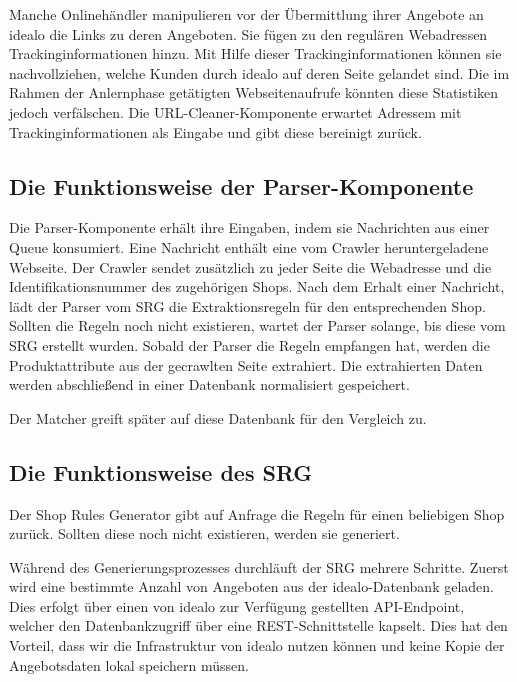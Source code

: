 Manche Onlinehändler manipulieren vor der Übermittlung ihrer Angebote an idealo die Links zu deren Angeboten.
Sie fügen zu den regulären Webadressen Trackinginformationen hinzu.
Mit Hilfe dieser Trackinginformationen können sie nachvollziehen, welche Kunden durch idealo auf deren Seite gelandet
sind.
Die im Rahmen der Anlernphase getätigten Webseitenaufrufe könnten diese Statistiken jedoch verfälschen.
Die URL-Cleaner-Komponente erwartet Adressem mit Trackinginformationen als Eingabe und gibt diese bereinigt zurück.

\subsection{Die Funktionsweise der Parser-Komponente}
\label{subsec:funktionsweise-parser}

Die Parser-Komponente erhält ihre Eingaben, indem sie Nachrichten aus einer Queue konsumiert.
Eine Nachricht enthält eine vom Crawler heruntergeladene Webseite.
Der Crawler sendet zusätzlich zu jeder Seite die Webadresse und die Identifikationsnummer des zugehörigen Shops.
Nach dem Erhalt einer Nachricht, lädt der Parser vom SRG die Extraktionsregeln für den entsprechenden Shop.
Sollten die Regeln noch nicht existieren, wartet der Parser solange, bis diese vom SRG erstellt wurden.
Sobald der Parser die Regeln empfangen hat, werden die Produktattribute aus der gecrawlten Seite extrahiert.
Die extrahierten Daten werden abschließend in einer Datenbank normalisiert gespeichert.

Der Matcher greift später auf diese Datenbank für den Vergleich zu.

\subsection{Die Funktionsweise des SRG}
\label{subsec:funktionsweise-srg}

Der Shop Rules Generator gibt auf Anfrage die Regeln für einen beliebigen Shop zurück.
Sollten diese noch nicht existieren, werden sie generiert.

Während des Generierungsprozesses durchläuft der SRG mehrere Schritte.
Zuerst wird eine bestimmte Anzahl von Angeboten aus der idealo-Datenbank geladen.
Dies erfolgt über einen von idealo zur Verfügung gestellten API-Endpoint, welcher den Datenbankzugriff über eine
REST-Schnittstelle kapselt.
Dies hat den Vorteil, dass wir die Infrastruktur von idealo nutzen können und keine Kopie der Angebotsdaten
lokal speichern müssen.

